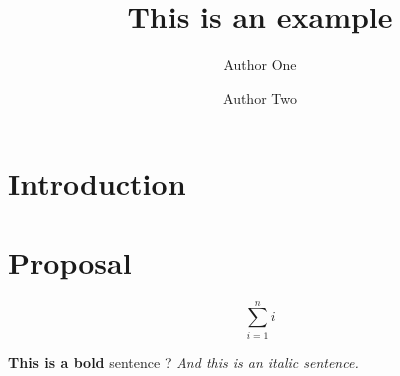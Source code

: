 \documentclass[fell]{class-for-drafts}
\title{This is an example}
\author{Author One \and Author Two}
\begin{document}
\maketitle

\section{Introduction}

\lipsum[1-3]

\section{Proposal}

\lipsum[1]

\begin{equation}
\sum_{i=1}^{n} i
\end{equation}


\textbf{This is a bold} sentence ?
\emph{And this is an italic sentence.}
\end{document}
